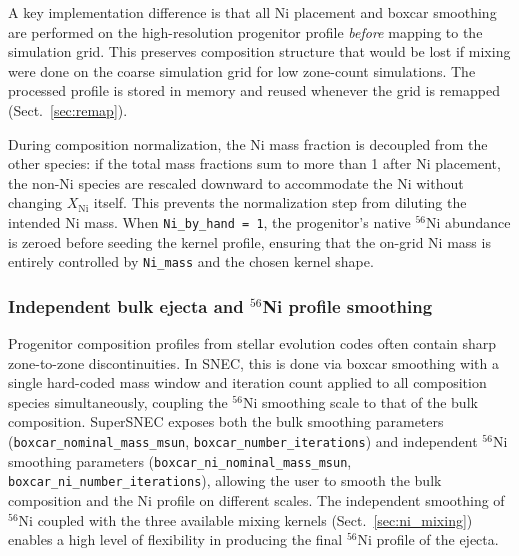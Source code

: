 \documentclass[twocolumn,linenumbers]{aastex701}
\begin{document}
A key implementation difference is that all Ni placement and boxcar smoothing are performed on the high-resolution progenitor profile \textit{before} mapping to the simulation grid. This preserves composition structure that would be lost if mixing were done on the coarse simulation grid for low zone-count simulations. The processed profile is stored in memory and reused whenever the grid is remapped (Sect.~\ref{sec:remap}).

During composition normalization, the Ni mass fraction is decoupled from the other species: if the total mass fractions sum to more than 1 after Ni placement, the non-Ni species are rescaled downward to accommodate the Ni without changing $X_{\mathrm{Ni}}$ itself. This prevents the normalization step from diluting the intended Ni mass. When \texttt{Ni\_by\_hand\,=\,1}, the progenitor's native $^{56}$Ni abundance is zeroed before seeding the kernel profile, ensuring that the on-grid Ni mass is entirely controlled by \texttt{Ni\_mass} and the chosen kernel shape.

\subsubsection{Independent bulk ejecta and $^{56}$Ni profile smoothing}
\label{sec:ni_independent_smoothing}

Progenitor composition profiles from stellar evolution codes often contain sharp zone-to-zone discontinuities.  In SNEC, this is done via boxcar smoothing with a single hard-coded mass window and iteration count applied to all composition species simultaneously, coupling the $^{56}$Ni smoothing scale to that of the bulk composition. SuperSNEC exposes both the bulk smoothing parameters (\texttt{boxcar\_\-nominal\_\-mass\_\-msun}, \texttt{boxcar\_\-number\_\-iterations}) and independent $^{56}$Ni smoothing parameters (\texttt{boxcar\_ni\_\-nominal\_mass\_msun}, \texttt{boxcar\_ni\_\-number\_iterations}), allowing the user to smooth the bulk composition and the Ni profile on different scales. The independent smoothing of $^{56}$Ni coupled with the three available mixing kernels (Sect.~\ref{sec:ni_mixing}) enables a high level of flexibility in producing the final $^{56}$Ni profile of the ejecta. 
\end{document}
